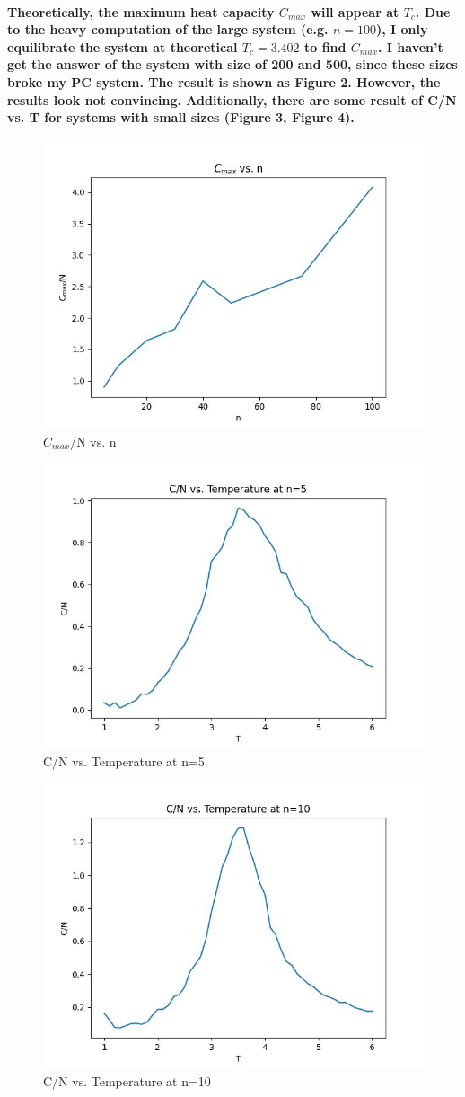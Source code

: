 \documentclass{article}
\begin{document}
\paragraph{
Theoretically, the maximum heat capacity $C_{max}$ will appear at $T_c$. Due to the heavy computation of the large system (e.g. \(n=100\)), I only equilibrate the system at theoretical $T_c=3.402$ to find $C_{max}$. I haven't get the answer of the system with size of 200 and 500, since these sizes broke my PC system. The result is shown as Figure 2. However, the results look not convincing. Additionally, there are some result of C/N vs. T for systems with small sizes (Figure 3, Figure 4).
}
\begin{figure}[htbp]
    \centering
    \includegraphics[width=0.5\linewidth]{Part2.jpeg}
    \caption{$C_{max}$/N vs. n}
\end{figure}
\begin{figure}[htbp]
    \centering
    \includegraphics[width=0.5\linewidth]{Part2_n=5.jpeg}
    \caption{C/N vs. Temperature at n=5}
\end{figure}
\begin{figure}[htbp]
    \centering
    \includegraphics[width=0.5\linewidth]{Part2_n=10.jpeg}
    \caption{C/N vs. Temperature at n=10}
\end{figure}
\end{document}
